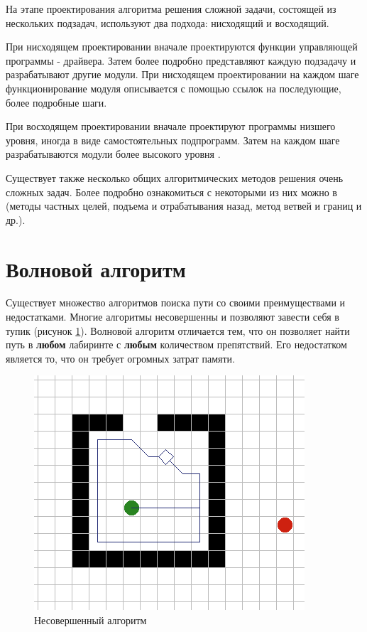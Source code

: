 На этапе проектирования алгоритма решения сложной задачи, состоящей из нескольких подзадач,  используют два подхода: нисходящий и восходящий.

При нисходящем проектировании вначале проектируются функции управляющей программы - драйвера. Затем более подробно представляют каждую подзадачу и разрабатывают другие модули. При нисходящем проектировании на каждом шаге функционирование модуля описывается с помощью ссылок на последующие, более подробные шаги.

При восходящем проектировании  вначале проектируют программы низшего уровня, иногда в виде самостоятельных подпрограмм. Затем на каждом шаге разрабатываются модули более высокого уровня \cite{comp:algoritm}.

Существует также несколько общих алгоритмических методов решения очень сложных задач. Более подробно ознакомиться с некоторыми из них можно в \cite{gudman:alg_coding} (методы частных целей, подъема и отрабатывания назад, метод ветвей и границ и др.).

\section{Волновой алгоритм}

Существует множество алгоритмов поиска пути со своими преимуществами и недостатками. Многие алгоритмы несовершенны и позволяют завести себя в тупик (рисунок \ref{fig:bumper}). Волновой алгоритм отличается тем, что он позволяет найти путь в \textbf{любом} лабиринте с \textbf{любым} количеством препятствий. Его недостатком является то, что он требует огромных затрат памяти.

\begin{figure}[ht]
    \includegraphics[width=.6\linewidth]{Figures/bumper.png}
    \caption{Несовершенный алгоритм}
    \label{fig:bumper}
\end{figure}

